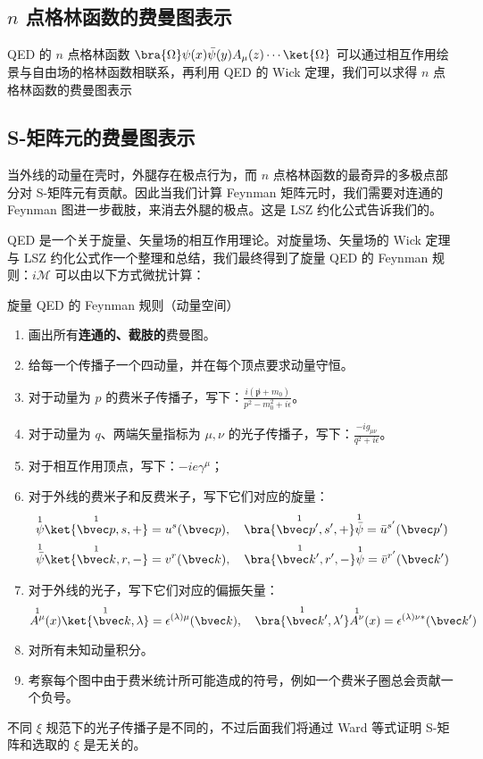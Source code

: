 
\subsection{$n$ 点格林函数的费曼图表示}
QED 的 $n$ 点格林函数 $\bra{\Omega} \psi(x)\bar\psi(y)A_\mu(z) \cdots \ket{\Omega}$ 可以通过相互作用绘景与自由场的格林函数相联系，再利用 QED 的 Wick 定理，我们可以求得 $n$ 点格林函数的费曼图表示

\subsection{S-矩阵元的费曼图表示}

当外线的动量在壳时，外腿存在极点行为，而 $n$ 点格林函数的最奇异的多极点部分对 S-矩阵元有贡献。因此当我们计算 Feynman 矩阵元时，我们需要对连通的 Feynman 图进一步截肢，来消去外腿的极点。这是 LSZ 约化公式告诉我们的。

QED 是一个关于旋量、矢量场的相互作用理论。对旋量场、矢量场的 Wick 定理与 LSZ 约化公式作一个整理和总结，我们最终得到了旋量 QED 的 Feynman 规则：$i\mathcal{M}$ 可以由以下方式微扰计算：
\begin{theorem}{旋量 QED 的 Feynman 规则（动量空间）}

\begin{enumerate}
\item 画出所有\textbf{连通的、截肢的}费曼图。
\item 给每一个传播子一个四动量，并在每个顶点要求动量守恒。
\item 对于动量为 $p$ 的费米子传播子，写下：$\frac{i(\not p+m_0)}{p^2-m_0^2 + i\epsilon}$。
\item 对于动量为 $q$、两端矢量指标为 $\mu,\nu$ 的光子传播子，写下：$\frac{-ig_{\mu\nu}}{q^2 + i\epsilon}$。
\item 对于相互作用顶点，写下：$-ie\gamma^\mu$；
\item 对于外线的费米子和反费米子，写下它们对应的旋量：
\begin{align*}
&\overset{1}{\psi}\overset{1}{\ket{\bvec p,s,+}}=u^s(\bvec p),\quad \overset{1}{\bra{\bvec p',s',+}} \overset{1}{\bar\psi}=\bar u^{s'}(\bvec p')\\
&\overset{1}{\bar\psi}\overset{1}{\ket{\bvec k,r,-}}=v^{r}(\bvec k),\quad \overset{1}{\bra{\bvec k',r',-}} \overset{1}{\psi}=\bar v^{r'}(\bvec k')
\end{align*}
\item 对于外线的光子，写下它们对应的偏振矢量：
\[
\overset{1}{A^\mu}(x) \overset{1}{\ket{\bvec k,\lambda}}=\epsilon^{(\lambda)\mu}(\bvec k),\quad \overset{1}{\bra{\bvec k',\lambda'}}\overset{1}{A^\nu}(x)=\epsilon^{(\lambda)\nu*}(\bvec k')
\]
\item 
对所有未知动量积分。
\item 
考察每个图中由于费米统计所可能造成的符号，例如一个费米子圈总会贡献一个负号。
\end{enumerate}
\end{theorem}
不同 $\xi$ 规范下的光子传播子是不同的，不过后面我们将通过 Ward 等式证明 S-矩阵和选取的 $\xi$ 是无关的。
